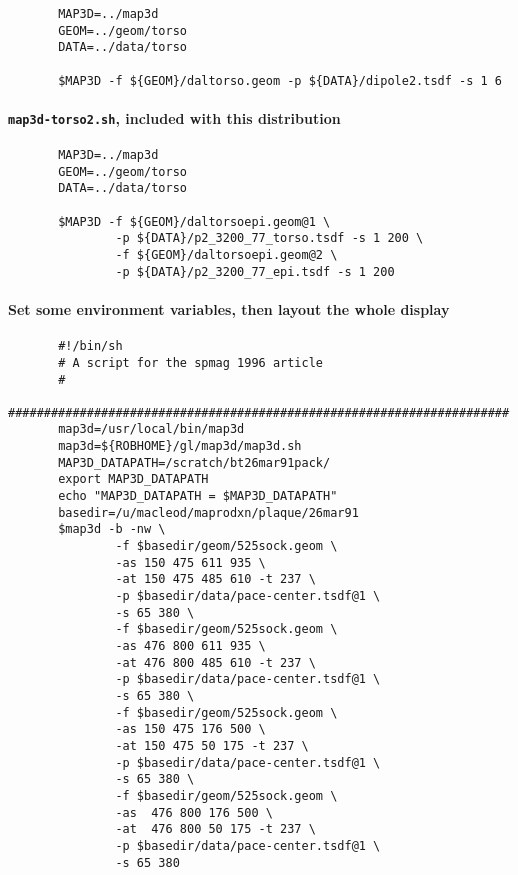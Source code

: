 \begin{verbatim}
       MAP3D=../map3d
       GEOM=../geom/torso
       DATA=../data/torso

       $MAP3D -f ${GEOM}/daltorso.geom -p ${DATA}/dipole2.tsdf -s 1 6
\end{verbatim}

\paragraph{\texttt{map3d-torso2.sh}, included with this distribution}

\begin{verbatim}
       MAP3D=../map3d
       GEOM=../geom/torso
       DATA=../data/torso

       $MAP3D -f ${GEOM}/daltorsoepi.geom@1 \
               -p ${DATA}/p2_3200_77_torso.tsdf -s 1 200 \
               -f ${GEOM}/daltorsoepi.geom@2 \
               -p ${DATA}/p2_3200_77_epi.tsdf -s 1 200

\end{verbatim}


\paragraph{Set some environment variables, then layout the whole display}

\begin{verbatim}
       #!/bin/sh
       # A script for the spmag 1996 article
       #
       ######################################################################
       map3d=/usr/local/bin/map3d
       map3d=${ROBHOME}/gl/map3d/map3d.sh
       MAP3D_DATAPATH=/scratch/bt26mar91pack/
       export MAP3D_DATAPATH
       echo "MAP3D_DATAPATH = $MAP3D_DATAPATH"
       basedir=/u/macleod/maprodxn/plaque/26mar91
       $map3d -b -nw \
               -f $basedir/geom/525sock.geom \
               -as 150 475 611 935 \
               -at 150 475 485 610 -t 237 \
               -p $basedir/data/pace-center.tsdf@1 \
               -s 65 380 \
               -f $basedir/geom/525sock.geom \
               -as 476 800 611 935 \
               -at 476 800 485 610 -t 237 \
               -p $basedir/data/pace-center.tsdf@1 \
               -s 65 380 \
               -f $basedir/geom/525sock.geom \
               -as 150 475 176 500 \
               -at 150 475 50 175 -t 237 \
               -p $basedir/data/pace-center.tsdf@1 \
               -s 65 380 \
               -f $basedir/geom/525sock.geom \
               -as  476 800 176 500 \
               -at  476 800 50 175 -t 237 \
               -p $basedir/data/pace-center.tsdf@1 \
               -s 65 380 
\end{verbatim}

